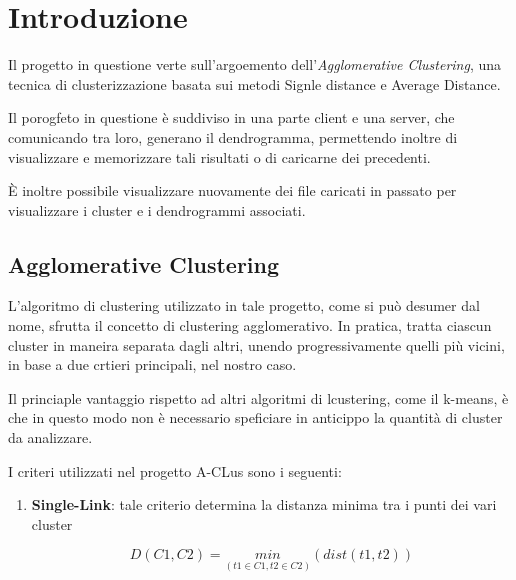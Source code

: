 \section{Introduzione}

Il progetto in questione verte sull'argoemento dell'\textit{Agglomerative Clustering}, una tecnica di clusterizzazione basata sui metodi Signle distance e Average Distance. 

Il porogfeto in questione è suddiviso in una parte client e una server, che comunicando tra loro, generano il dendrogramma, permettendo inoltre di visualizzare e memorizzare tali risultati o di caricarne dei precedenti.

È inoltre possibile visualizzare nuovamente dei file caricati in passato per visualizzare i cluster e i dendrogrammi associati. 


\subsection{Agglomerative Clustering}

L'algoritmo di clustering utilizzato in tale progetto, come si può desumer dal nome, sfrutta il concetto di clustering agglomerativo. In pratica, tratta ciascun cluster in maneira separata dagli altri, unendo progressivamente quelli più vicini, in base a due crtieri principali, nel nostro caso.

Il princiaple vantaggio  rispetto ad altri algoritmi di lcustering, come il k-means, è che in questo modo non è necessario speficiare in anticippo la quantità di cluster da analizzare. 

I criteri utilizzati nel progetto A-CLus sono i seguenti: 

\begin{enumerate}
    \item \textbf{Single-Link}: tale criterio determina la distanza minima tra i punti dei vari cluster

    \begin{equation}
        D\left(C1,C2\right) = \underset{\left(t1 \in C1,t2 \in C2\right)}{min}\left( dist\left(t1,t2\right)\right)
    \end{equation}
\end{enumerate}